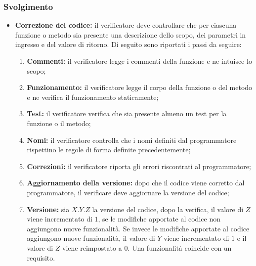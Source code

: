 \subsubsection{Svolgimento}
\begin{itemize}
	\item \textbf{Correzione del codice:} il verificatore deve controllare che per
	      ciascuna funzione o metodo sia presente una descrizione dello scopo,
	      dei parametri in ingresso e del valore di ritorno. Di seguito sono
	      riportati i passi da seguire:
	      \begin{enumerate}
		      \item \textbf{Commenti:} il verificatore legge i commenti della
		            funzione e ne intuisce lo scopo;

		      \item \textbf{Funzionamento:} il verificatore legge il corpo
		            della funzione o del metodo e ne verifica il funzionamento
		            staticamente;

		      \item \textbf{Test:} il verificatore verifica che sia
		            presente almeno un test per la funzione o il metodo;


		      \item \textbf{Nomi:} il verificatore controlla che i nomi definiti
		            dal programmatore rispettino le regole di forma definite
		            precedentemente;

		      \item \textbf{Correzioni:} il verificatore riporta
		            gli errori riscontrati al programmatore;

		      \item \textbf{Aggiornamento della versione:} dopo che il codice
		            viene corretto dal programmatore, il verificare deve aggiornare
		            la versione del codice;

		      \item \textbf{Versione:} sia $X.Y.Z$ la versione del codice,
		            dopo la verifica, il valore di $Z$ viene incrementato di
		            $1$, se le modifiche apportate al codice non aggiungono
		            nuove funzionalità. Se invece le modifiche apportate al
		            codice aggiungono nuove funzionalità, il valore di $Y$ viene
		            incrementato di $1$ e il valore di $Z$ viene reimpostato a
		            $0$. Una funzionalità coincide con un requisito.
	      \end{enumerate}
\end{itemize}
